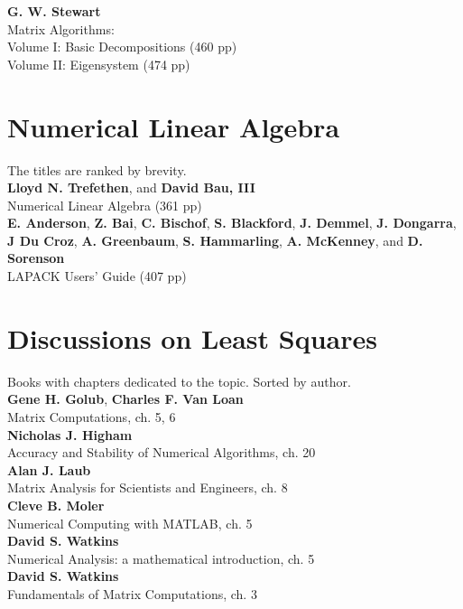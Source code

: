 \noindent
\textbf{G. W. Stewart}\\
Matrix Algorithms: \\
Volume I: Basic Decompositions (460 pp) \\
Volume II: Eigensystem (474 pp) \\

\section{Numerical Linear Algebra}  %
The titles are ranked by brevity. \\

\noindent
\textbf{Lloyd N. Trefethen}, and \textbf{David Bau, III} \\
Numerical Linear Algebra (361 pp) \\

\noindent
\textbf{E. Anderson}, \textbf{Z. Bai}, \textbf{C. Bischof}, \textbf{S. Blackford}, \textbf{J. Demmel}, \textbf{J. Dongarra}, \textbf{J Du Croz}, \textbf{A. Greenbaum}, \textbf{S. Hammarling}, \textbf{A. McKenney}, and \textbf{D. Sorenson} \\
LAPACK Users' Guide (407 pp)\\

\section{Discussions on Least Squares}  %

Books with chapters dedicated to the topic. Sorted by author.\\

\noindent
\textbf{Gene H. Golub}, \textbf{Charles F. Van Loan} \\
Matrix Computations, ch. 5, 6 \\

\noindent
\textbf{Nicholas J. Higham} \\
Accuracy and Stability of Numerical Algorithms, ch. 20 \\

\noindent
\textbf{Alan J. Laub}\\
Matrix Analysis for Scientists and Engineers, ch. 8 \\

\noindent
\textbf{Cleve B. Moler} \\
Numerical Computing with MATLAB, ch. 5 \\

\noindent
\textbf{David S. Watkins} \\
Numerical Analysis: a mathematical introduction, ch. 5 \\

\noindent
\textbf{David S. Watkins} \\
Fundamentals of Matrix Computations, ch. 3 \\



\endinput